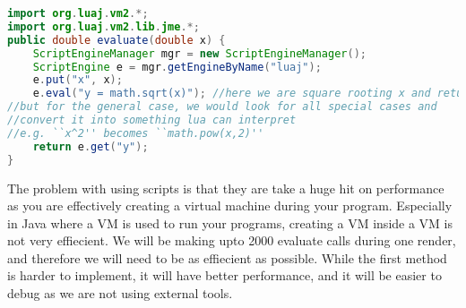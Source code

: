 \documentclass{report}
\begin{document}
\begin{lstlisting}[language=Java]
import org.luaj.vm2.*;
import org.luaj.vm2.lib.jme.*;
public double evaluate(double x) {
   	ScriptEngineManager mgr = new ScriptEngineManager();
	ScriptEngine e = mgr.getEngineByName("luaj");
	e.put("x", x);
	e.eval("y = math.sqrt(x)");	//here we are square rooting x and returning it, 
//but for the general case, we would look for all special cases and
//convert it into something lua can interpret
//e.g. ``x^2'' becomes ``math.pow(x,2)''
	return e.get("y");	
}
\end{lstlisting}

The problem with using scripts is that they are take a huge hit on performance as you are effectively creating a virtual machine during your program. Especially in Java where a VM is used to run your programs, creating a VM inside a VM is not very effiecient. We will be making upto 2000 evaluate calls during one render, and therefore we will need to be as effiecient as possible. While the first method is harder to implement, it will have better performance, and it will be easier to debug as we are not using external tools.
\newpage
\end{document}
